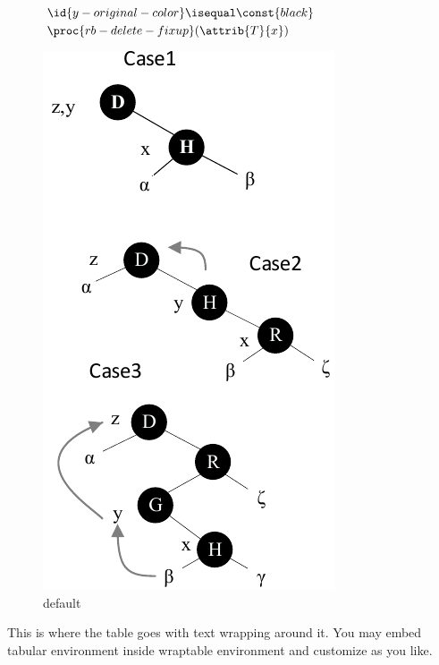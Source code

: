\documentclass[a4paper,12pt]{article}
\begin{document}
\begin{figure}[ht]
\begin{minipage}[b]{0.45\linewidth}
\begin{codebox}
    \li    \If $ \id{y-original-color} \isequal \const{black} $
    \li       \Then $\proc{rb-delete-fixup}(\attrib{T}{x})$
    \End
\end{codebox}
  \label{fig:figure1}
  \end{minipage}
  \hspace{2cm}
  \begin{minipage}[b]{0.45\linewidth}
  \centering
  \includegraphics[width=\textwidth]{rb_delete_cases_single.pdf}
  \caption{default}
  \label{fig:figure2}
  \end{minipage}
  \end{figure}
  This is where the table goes with text wrapping around it. You may 
embed tabular environment inside wraptable environment and customize as you like.
\end{document}
